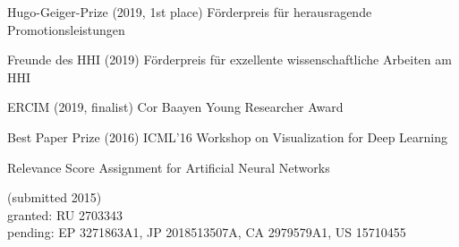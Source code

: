 \documentclass[10pt,a4paper]{article} %
\begin{document}





\inlineheadsection %
{Hugo-Geiger-Prize (2019, 1st place)}
{
    F\"orderpreis f\"ur herausragende Promotionsleistungen
}

\inlineheadsection %
{Freunde des HHI (2019)}
{
    F\"orderpreis f\"ur exzellente wissenschaftliche Arbeiten am HHI
}

\inlineheadsection %
{ERCIM (2019, finalist)}
{
    Cor Baayen Young Researcher Award
}

\inlineheadsection %
{Best Paper Prize (2016)}
{
    ICML'16 Workshop on Visualization for Deep Learning
}


\spacedhrule{1.6em}{-0.4em} %





\inlineheadsection %
{Relevance Score Assignment for Artificial Neural Networks\\}
{
    (submitted 2015)\\
    granted:
    RU 2703343\\
    pending:
    EP 3271863A1, JP 2018513507A, CA 2979579A1, US 15710455

}
\end{document}
